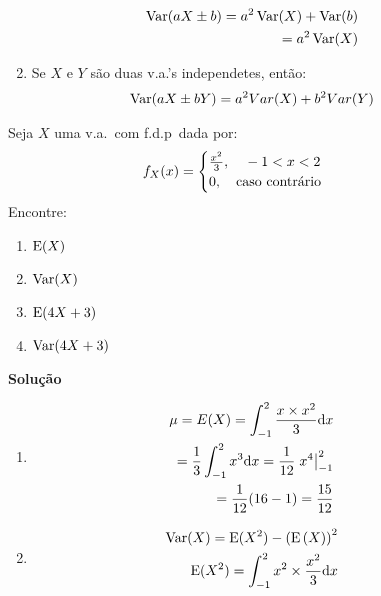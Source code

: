 \begin{description}
\begin{enumerate}[label=(\alph*)]
                \begin{align*}
                 \operatorname{Var}(aX\pm b)=a^2 \operatorname{Var}(X)+\operatorname{Var}(b)\\
               =a^2 \operatorname{Var}(X)
               \end{align*}
             \item Se $X$ e $Y$ são duas v.a.'s independetes, então: 
  \begin{align*}
                 \operatorname{Var}(aX \pm bY)=a^2 Var(X)+ b^2 Var(Y)
  \end{align*}
           \end{enumerate}
           \begin{example}
             Seja $X$ uma v.a.\ com f.d.p\ dada por: 
             \begin{align}
               f_{X}(x)=
               \begin{cases}
                 \frac{x^2}{3}, \text{\quad} -1<x<2\\
                 0, \text{\quad caso contrário}
               \end{cases}
             \end{align}
             Encontre:
                 \begin{enumerate}[label=(\alph*)]
                   \item $\operatorname{E}(X)$
                   \item $\operatorname{Var}(X)$
                   \item $\operatorname{E}(4X+3)$
                   \item $\operatorname{Var}(4X+3)$
                 \end{enumerate}
                 \textbf{Solução}
                 \begin{enumerate}[label=(\alph*)]
                   \item 
                     \begin{align*}
                       \mu= E(X)=  \int_{-1}^{2}\frac{x\times x^2}{3}\mathrm{d}x\\
                       =\frac{1}{3}\int_{-1}^{2}x^3\mathrm{d}x=\frac{1}{12} \left.x^4\right\rvert_{-1}^{2}\\
                       =\frac{1}{12}(16-1)=\frac{15}{12}
                     \end{align*}
                   \item 
                     \begin{align*}
                       \Var(X)=\E(X^2)-\left(\E\left(X\right)\right)^2\\
                       \E(X^2)=\int_{-1}^{2} x^2 \times \frac{x^2}{3}\mathrm{d}x

\end{align*}
\end{enumerate}
\end{example}
\end{description}
